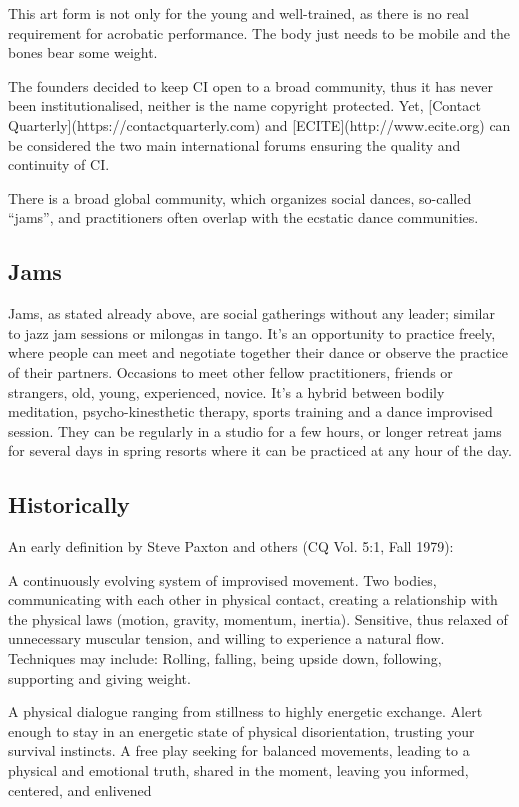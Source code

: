 This art form is not only for the young and well-trained, as there is no real requirement for acrobatic performance.
The body just needs to be mobile and the bones bear some weight.

The founders decided to keep CI open to a broad community, thus it has never been institutionalised, neither is the name copyright protected.
Yet, [Contact Quarterly](https://contactquarterly.com) and [ECITE](http://www.ecite.org) can be considered the two main international forums ensuring the quality and continuity of CI.

There is a broad global community, which organizes social dances, so-called ``jams'', and practitioners often overlap with the ecstatic dance communities.

\subsection{Jams}\label{subsec:jams}

Jams, as stated already above, are social gatherings without any leader; similar to jazz jam sessions or milongas in tango.
It's an opportunity to practice freely, where people can meet and negotiate together their dance or observe the practice of their partners.
Occasions to meet other fellow practitioners, friends or strangers, old, young, experienced, novice.
It's a hybrid between bodily meditation, psycho-kinesthetic therapy, sports training and a dance improvised session.
They can be regularly in a studio for a few hours, or longer retreat jams for several days in spring resorts where it can be practiced at any hour of the day.

\subsection{Historically}\label{subsec:historically}

An early definition by Steve Paxton and others (CQ Vol. 5:1, Fall 1979):

A continuously evolving system of improvised movement.
Two bodies, communicating with each other in physical contact, creating a relationship with the physical laws (motion, gravity, momentum, inertia).
Sensitive, thus relaxed of unnecessary muscular tension, and willing to experience a natural flow.
Techniques may include: Rolling, falling, being upside down, following, supporting and giving weight.

A physical dialogue ranging from stillness to highly energetic exchange.
Alert enough to stay in an energetic state of physical disorientation, trusting your survival instincts.
A free play seeking for balanced movements, leading to a physical and emotional truth, shared in the moment, leaving you informed, centered, and enlivened

